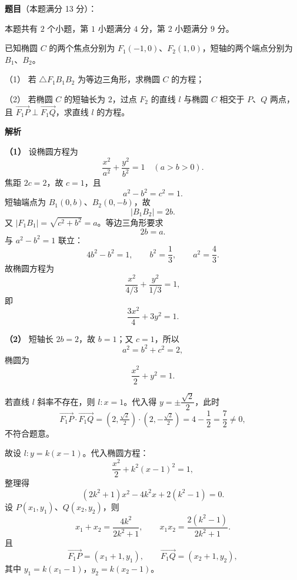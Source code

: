 \begin{answer}

\textbf{题目}（本题满分 13 分）：

本题共有 $2$ 个小题，第 $1$ 小题满分 $4$ 分，第 $2$ 小题满分 $9$ 分。

已知椭圆 $C$ 的两个焦点分别为 $F_1(-1,0)$、$F_2(1,0)$，短轴的两个端点分别为 $B_1$、$B_2$。

（1） 若 $\triangle F_1B_1B_2$ 为等边三角形，求椭圆 $C$ 的方程；

（2） 若椭圆 $C$ 的短轴长为 $2$，过点 $F_2$ 的直线 $l$ 与椭圆 $C$ 相交于 $P$、$Q$ 两点，且 $\overrightarrow{F_1P}\perp\overrightarrow{F_1Q}$，求直线 $l$ 的方程。

\textbf{解析}

\textbf{（1）} 设椭圆方程为
\nopagebreak[4]
\[\frac{x^2}{a^2}+\frac{y^2}{b^2}=1\quad(a>b>0).\]
焦距 $2c=2$，故 $c=1$，且
\nopagebreak[4]
\[a^2-b^2=c^2=1.\]
短轴端点为 $B_1(0,b)$、$B_2(0,-b)$，故
\nopagebreak[4]
\[|B_1B_2|=2b.\]
又 $|F_1B_1|=\sqrt{c^2+b^2}=a$。等边三角形要求
\nopagebreak[4]
\[2b=a.\]
与 $a^2-b^2=1$ 联立：
\nopagebreak[4]
\[4b^2-b^2=1,\qquad b^2=\frac13,\qquad a^2=\frac43.\]
故椭圆方程为
\nopagebreak[4]
\[\frac{x^2}{4/3}+\frac{y^2}{1/3}=1,\]
即
\nopagebreak[4]
\[\frac{3x^2}{4}+3y^2=1.\]

\textbf{（2）} 短轴长 $2b=2$，故 $b=1$；又 $c=1$，所以
\nopagebreak[4]
\[a^2=b^2+c^2=2,\]
椭圆为
\nopagebreak[4]
\[\frac{x^2}{2}+y^2=1.\]

若直线 $l$ 斜率不存在，则 $l:x=1$。代入得 $y=\pm\dfrac{\sqrt2}{2}$，此时
\nopagebreak[4]
\[\overrightarrow{F_1P}\cdot\overrightarrow{F_1Q}
=(2,\tfrac{\sqrt2}{2})\cdot(2,-\tfrac{\sqrt2}{2})
=4-\frac12=\frac72\neq0,\]
不符合题意。

故设 $l:y=k(x-1)$。代入椭圆方程：
\nopagebreak[4]
\[\frac{x^2}{2}+k^2(x-1)^2=1,\]
整理得
\nopagebreak[4]
\[(2k^2+1)x^2-4k^2x+2(k^2-1)=0.\]
设 $P(x_1,y_1)$、$Q(x_2,y_2)$，则
\nopagebreak[4]
\[x_1+x_2=\frac{4k^2}{2k^2+1},\qquad
x_1x_2=\frac{2(k^2-1)}{2k^2+1}.\]
且
\nopagebreak[4]
\[\overrightarrow{F_1P}=(x_1+1,y_1),\qquad
\overrightarrow{F_1Q}=(x_2+1,y_2),\]
其中 $y_1=k(x_1-1)$，$y_2=k(x_2-1)$。


\end{answer}
